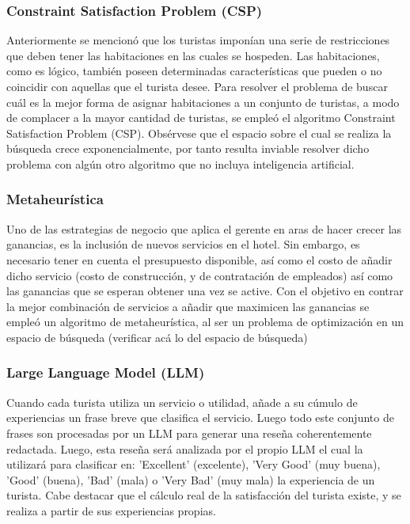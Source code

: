 \documentclass[12pt,a4paper]{article} \usepackage[spanish]{babel} \usepackage{graphicx} \usepackage{amsmath} \usepackage{amsfonts} \usepackage{amssymb} \usepackage{float} \usepackage{geometry}
\begin{document}
\subsubsection{Constraint Satisfaction Problem (CSP)}
Anteriormente se mencionó que los turistas imponían una serie de restricciones que deben tener las habitaciones en las cuales se hospeden. Las habitaciones, como es lógico, también poseen determinadas características que pueden o no coincidir con aquellas que el turista desee. Para resolver el problema de buscar cuál es la mejor forma de asignar habitaciones a un conjunto de turistas, a modo de complacer a la mayor cantidad de turistas, se empleó el algoritmo Constraint Satisfaction Problem (CSP). Obsérvese que el espacio sobre el cual se realiza la búsqueda crece exponencialmente, por tanto resulta inviable resolver dicho problema con algún otro algoritmo que no incluya inteligencia artificial.

\subsubsection{Metaheurística}
Uno de las estrategias de negocio que aplica el gerente en aras de hacer crecer las ganancias, es la inclusión de nuevos servicios en el hotel. Sin embargo, es necesario tener en cuenta el presupuesto disponible, así como el costo de añadir dicho servicio (costo de construcción, y de contratación de empleados) así como las ganancias que se esperan obtener una vez se active. Con el objetivo en contrar la mejor combinación de servicios a añadir que maximicen las ganancias se empleó un algoritmo de metaheurística, al ser un problema de optimización en un espacio de búsqueda (verificar acá lo del espacio de búsqueda)

\subsubsection{Large Language Model (LLM)}
Cuando cada turista utiliza un servicio o utilidad, añade a su cúmulo de experiencias un frase breve que clasifica el servicio. Luego todo este conjunto de frases son procesadas por un LLM para generar una reseña coherentemente redactada. Luego, esta reseña será analizada por el propio LLM el cual la utilizará para clasificar en: 'Excellent' (excelente), 'Very Good' (muy buena), 'Good' (buena), 'Bad' (mala) o 'Very Bad' (muy mala) la experiencia de un turista. Cabe destacar que el cálculo real de la satisfacción del turista existe, y se realiza a partir de sus experiencias propias.
\end{document}
